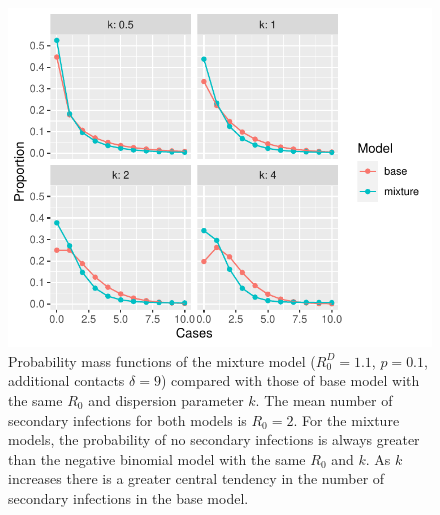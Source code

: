 \documentclass{imammb}
\numberwithin{equation}{section}
\begin{document}
\begin{figure}[!t] %
\centering\includegraphics {Figure1.pdf}
\caption{Probability mass functions of the mixture model ($R_0^D=1.1$, $p=0.1$, additional contacts $\delta =9$) compared with those of base model with the same $R_0$ and dispersion parameter $k$. The mean number of secondary infections for both models is $R_0 =2$. For the mixture models, the probability of no secondary infections is always greater than the negative binomial model with the same $R_0$ and $k$. As $k$ increases there is a greater central tendency in the number of secondary infections in the base model.  }
\label{fig:pmf}\vspace*{-9pt}
\end{figure}


\end{document}
